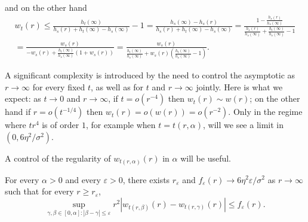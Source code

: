 \documentclass[10pt,a4paper]{article}
\begin{document}
and on the other hand
\begin{multline}\label{eq:2upper-bound-wt-strong}
w_t(r) \leq \frac{h_t(\infty)}{h_s(r) + h_t(\infty) - h_s(\infty)}-1 = \frac{h_s(\infty)-h_s(r)}{h_s(r) + h_t(\infty) - h_s(\infty)} = \frac{1-\frac{h_s(r)}{h_s(\infty)}}{\frac{h_s(r)}{h_s(\infty)} + \frac{h_t(\infty)}{h_s(\infty)} - 1} \\
= \frac{w_s(r)}{-w_s(r) + \frac{h_t(\infty)}{h_s(\infty)}(1+w_s(r))} = \frac{w_s(r)}{\frac{h_t(\infty)}{h_s(\infty)} + w_s(r)\left(\frac{h_t(\infty)}{h_s(\infty)}-1\right)} . 
\end{multline}



\begin{remark}

A significant complexity is introduced by the need to control the asymptotic as $r\to\infty$ for every fixed $t$, as well as for $t$ and $r\to\infty$ jointly. Here is what we expect: as $t\to 0$ and $r\to\infty$, if $t = o(r^{-4})$ then $w_t(r) \sim w(r)$; on the other hand if $r = o(t^{-1/4})$ then $w_t(r) = o(w(r)) = o(r^{-2})$. Only in the regime where $t r^4$ is of order $1$, for example when $t=t(r,\alpha)$, will we see a limit in $(0,6\eta^2/\sigma^2)$. 
 
\end{remark}




A control of the regularity of $w_{t(r,\alpha)}(r)$ in $\alpha$ will be useful. 

\begin{lemma}\label{lem:2uniform-continuity-u}
For every $\alpha>0$ and every $\varepsilon>0$, there exists $r_\varepsilon$ and $f_\varepsilon(r) \to 6 \eta^2 \varepsilon / \sigma^2$ as $r\to\infty$ such that for every $r\geq r_\varepsilon$, 
\[ \sup_{\gamma, \beta \in [0,\alpha]: |\beta-\gamma|\leq \varepsilon} r^2 \left| w_{t(r,\beta)}(r) - w_{t(r,\gamma)}(r) \right| \leq f_\varepsilon(r) . \]
\end{lemma}
\end{document}
